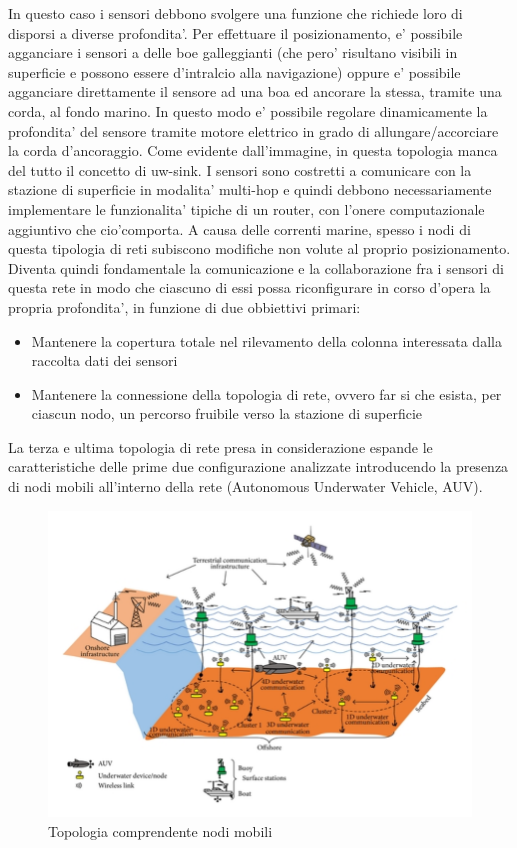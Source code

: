 In questo caso i sensori debbono svolgere una funzione che richiede loro di disporsi a diverse profondita'. Per effettuare il posizionamento, e' possibile agganciare i sensori a delle boe galleggianti (che pero' risultano visibili in superficie e possono essere d'intralcio alla navigazione) oppure e' possibile agganciare direttamente il sensore ad una boa ed ancorare la stessa, tramite una corda, al fondo marino.  In questo modo e' possibile regolare dinamicamente la profondita' del sensore tramite motore elettrico in grado di allungare/accorciare la corda d'ancoraggio. Come evidente dall'immagine, in questa topologia manca del tutto il concetto di uw-sink. I sensori sono costretti a comunicare con la stazione di superficie in modalita' multi-hop e quindi debbono necessariamente implementare le funzionalita' tipiche di un router, con l'onere computazionale aggiuntivo che cio'comporta. A causa delle correnti marine, spesso i nodi di questa tipologia di reti subiscono modifiche non volute al proprio posizionamento. Diventa quindi fondamentale la comunicazione e la collaborazione fra i sensori di questa rete in modo che ciascuno di essi possa riconfigurare in corso d'opera la propria profondita', in funzione di due obbiettivi primari:
\begin{itemize}

 \item Mantenere la copertura totale nel rilevamento della colonna interessata dalla raccolta dati dei sensori

\item Mantenere la connessione della topologia di rete, ovvero far si che esista, per ciascun nodo, un percorso fruibile verso la stazione di superficie
\end{itemize}

La terza e ultima topologia di rete presa in considerazione espande le caratteristiche delle prime due configurazione analizzate introducendo la presenza di nodi mobili all'interno della rete (Autonomous Underwater Vehicle, AUV).

\begin{figure}[h]
	\includegraphics[width=\linewidth]{auv_arch.png}
	\caption{ Topologia comprendente nodi mobili}
	\label{fig:}
\end{figure}

